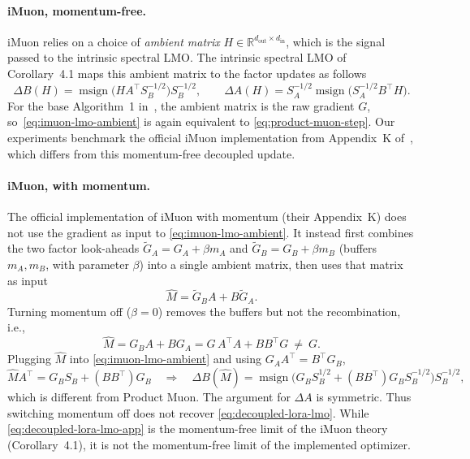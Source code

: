 \documentclass[11pt]{article}
\newcommand{\R}{\mathbb{R}}
\DeclareMathOperator{\msign}{msign}
\theoremstyle{plain}
\theoremstyle{definition}
\theoremstyle{remark}
\theoremstyle{definition}
\begin{document}
\paragraph{iMuon, momentum-free.}
iMuon relies on a choice of \emph{ambient matrix} $H\in\R^{d_{\mathrm{out}}\times d_{\mathrm{in}}}$, which is the signal passed to the intrinsic spectral LMO. The intrinsic spectral LMO of Corollary~4.1 maps this ambient matrix to the factor updates as follows
\begin{equation}
  \Delta B(H) =\msign \big(HA^\top S_B^{-1/2}\big)S_B^{-1/2},\qquad
  \Delta A(H) =S_A^{-1/2}\msign \big(S_A^{-1/2}B^\top H\big).
  \label{eq:imuon-lmo-ambient}
\end{equation}
For the base Algorithm~1 in~\cite{imuon}, the ambient matrix is the raw gradient $G$, so~\eqref{eq:imuon-lmo-ambient}
is again equivalent to \eqref{eq:product-muon-step}. Our experiments benchmark the official iMuon implementation from Appendix~K of~\cite{imuon}, which differs from this momentum-free decoupled update.

\paragraph{iMuon, with momentum.} The official implementation of iMuon with momentum (their Appendix~K) does not
use the gradient as input to \eqref{eq:imuon-lmo-ambient}. 
It instead first combines the two factor
look-aheads $\widetilde{G}_A=G_A+\beta m_A$ and $\widetilde{G}_B=G_B+\beta m_B$ (buffers $m_A,m_B$,
with parameter $\beta$) into a single ambient matrix, then uses that matrix as input
\begin{equation*}
  \widehat M=\widetilde{G}_B A+B\widetilde{G}_A .
\end{equation*}
Turning momentum off ($\beta=0$) removes the buffers but not the recombination, i.e.,
\begin{equation*}
  \widehat M=G_B A+B G_A=G\,A^\top A+BB^\top G\ \neq\ G .
\end{equation*}
Plugging $\widehat M$ into \eqref{eq:imuon-lmo-ambient} and using $G_A A^\top=B^\top G_B$,
\begin{equation*}
  \widehat M A^\top=G_B S_B+(BB^\top)G_B
  \quad\Longrightarrow\quad
  \Delta B(\widehat M)=\msign\!\big(G_B S_B^{1/2}+(BB^\top)G_B S_B^{-1/2}\big)S_B^{-1/2},
\end{equation*}
which is different from Product Muon. The argument for $\Delta A$ is symmetric.
Thus switching momentum off does not recover \eqref{eq:decoupled-lora-lmo}. While
\eqref{eq:decoupled-lora-lmo-app} is the
momentum-free limit of the iMuon theory (Corollary~4.1), 
it is not the momentum-free limit of the implemented optimizer.
\end{document}
